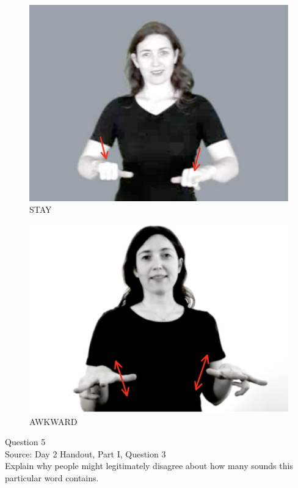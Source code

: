 \documentclass[12pt]{article}
\begin{document}
\begin{figure}[H]
\includegraphics{../images/asl_stay.png}
\caption{STAY}
\end{figure}
\begin{figure}[H]
\includegraphics{../images/asl_awkward.png}
\caption{AWKWARD}
\end{figure}

\newpage

{\large Question 5}\\

Source: Day 2 Handout, Part I, Question 3\\

Explain why people might legitimately disagree about how many sounds this particular word contains.\\
\end{document}
